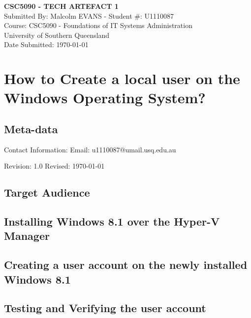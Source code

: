 \documentclass[12pt, a4paper]{article}
\begin{document}
\begin{titlepage}
\begin{center}
\vspace*{8cm}
\MakeUppercase{\textbf{CSC5090 - Tech Artefact 1}}\\
\vfill
Submitted By: Malcolm EVANS - Student \#: U1110087\\[5mm]
Course: CSC5090 - Foundations of IT Systems Administration\\[2mm]
University of Southern Queensland\\[2mm]
Date Submitted: {\today}
\end{center}
\end{titlepage}

\tableofcontents
\thispagestyle{empty}
\clearpage
\setcounter{page}{1}

\section{How to Create a local user on the Windows Operating System?}
\subsection{Meta-data}
Contact Information: 
Email: u1110087@umail.usq.edu.au

Revision: 1.0
Revised: {\today}
\subsection{Target Audience}

\subsection{Installing Windows 8.1 over the Hyper-V Manager}
\lipsum[1]
\pagebreak
\subsection{Creating a user account on the newly installed Windows 8.1}
\lipsum[1-2]
\subsection{Testing and Verifying the user account}

\pagebreak
\end{document}
